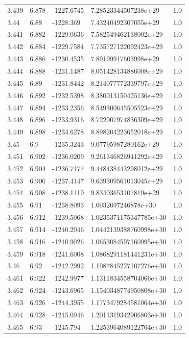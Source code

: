 \begin{tabular}{lllll}
3.439 & 6.878 & -1227.6745 & 7.28523344507238e+29 & 1.0 \\
3.44 & 6.88 & -1228.369 & 7.43240492307055e+29 & 1.0 \\
3.441 & 6.882 & -1229.0636 & 7.582549462138002e+29 & 1.0 \\
3.442 & 6.884 & -1229.7584 & 7.735727122092423e+29 & 1.0 \\
3.443 & 6.886 & -1230.4535 & 7.89199917603998e+29 & 1.0 \\
3.444 & 6.888 & -1231.1487 & 8.051428134886008e+29 & 1.0 \\
3.445 & 6.89 & -1231.8442 & 8.214077772339797e+29 & 1.0 \\
3.446 & 6.892 & -1232.5398 & 8.380013150425136e+29 & 1.0 \\
3.447 & 6.894 & -1233.2356 & 8.549300645505523e+29 & 1.0 \\
3.448 & 6.896 & -1233.9316 & 8.722007974836309e+29 & 1.0 \\
3.449 & 6.898 & -1234.6278 & 8.898204223652018e+29 & 1.0 \\
3.45 & 6.9 & -1235.3243 & 9.07795987280162e+29 & 1.0 \\
3.451 & 6.902 & -1236.0209 & 9.261346826941292e+29 & 1.0 \\
3.452 & 6.904 & -1236.7177 & 9.448438443298012e+29 & 1.0 \\
3.453 & 6.906 & -1237.4147 & 9.639309561013045e+29 & 1.0 \\
3.454 & 6.908 & -1238.1119 & 9.83403653107819e+29 & 1.0 \\
3.455 & 6.91 & -1238.8093 & 1.0032697246878e+30 & 1.0 \\
3.456 & 6.912 & -1239.5068 & 1.0235371175347785e+30 & 1.0 \\
3.457 & 6.914 & -1240.2046 & 1.0442139388760998e+30 & 1.0 \\
3.458 & 6.916 & -1240.9026 & 1.0653084597160095e+30 & 1.0 \\
3.459 & 6.918 & -1241.6008 & 1.0868291181441231e+30 & 1.0 \\
3.46 & 6.92 & -1242.2992 & 1.1087845227107276e+30 & 1.0 \\
3.461 & 6.922 & -1242.9977 & 1.1311834558704066e+30 & 1.0 \\
3.462 & 6.924 & -1243.6965 & 1.1540348774950808e+30 & 1.0 \\
3.463 & 6.926 & -1244.3955 & 1.1773479284581064e+30 & 1.0 \\
3.464 & 6.928 & -1245.0946 & 1.2011319342906803e+30 & 1.0 \\
3.465 & 6.93 & -1245.794 & 1.2253964089122764e+30 & 1.0 \\

\end{tabular}
